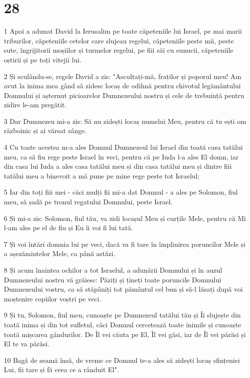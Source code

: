 \chapter{28}

\par 1 Apoi a adunat David la Ierusalim pe toate căpeteniile lui Israel, pe mai marii triburilor, căpeteniile cetelor care slujeau regelui, căpeteniile peste mii, peste sute, îngrijitorii moșiilor și turmelor regelui, pe fiii săi cu eunucii, căpeteniile oștirii și pe toți vitejii lui.
\par 2 Și sculându-se, regele David a zis: "Ascultați-mă, fraților și poporul meu! Am avut la inima mea gând să zidesc locaș de odihnă pentru chivotul legământului Domnului și așternut picioarelor Dumnezeului nostru și cele de trebuință pentru zidire le-am pregătit.
\par 3 Dar Dumnezeu mi-a zis: Să nu zidești locaș numelui Meu, pentru că tu ești om războinic și ai vărsat sânge.
\par 4 Cu toate acestea m-a ales Domnul Dumnezeul lui Israel din toată casa tatălui meu, ca să fiu rege peste Israel în veci, pentru că pe Iuda l-a ales El domn, iar din casa lui Iuda a ales casa tatălui meu și din casa tatălui meu și dintre fiii tatălui meu a binevoit a mă pune pe mine rege peste tot Israelul;
\par 5 Iar din toți fiii mei - căci mulți fii mi-a dat Domnul - a ales pe Solomon, fiul meu, să șadă pe tronul regatului Domnului, peste Israel.
\par 6 Și mi-a zis: Solomon, fiul tău, va zidi locașul Meu și curțile Mele, pentru că Mi l-am ales pe el de fiu și Eu îi voi fi lui tată.
\par 7 Și voi întări domnia lui pe veci, dacă va fi tare în împlinirea poruncilor Mele și a așezămintelor Mele, ca până astăzi.
\par 8 Și acum înaintea ochilor a tot Israelul, a adunării Domnului și în auzul Dumnezeului nostru vă grăiesc: Păziți și țineți toate poruncile Domnului Dumnezeului vostru, ca să stăpâniți tot pământul cel bun și să-l lăsați după voi moștenire copiilor voștri pe veci.
\par 9 Și tu, Solomon, fiul meu, cunoaște pe Dumnezeul tatălui tău și Îi slujește din toată inima și din tot sufletul, căci Domnul cercetează toate inimile și cunoaște toată mișcarea gândurilor. De Îl vei căuta pe El, Îl vei găsi, iar de Îl vei părăsi și El te va părăsi.
\par 10 Bagă de seamă însă, de vreme ce Domnul te-a ales să zidești locaș sfințeniei Lui, fii tare și fă ceea ce a rânduit El".
